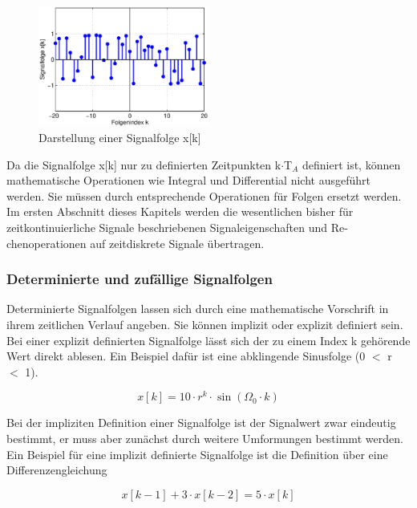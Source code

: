 \begin{figure}[H]
  \centerline{\includegraphics[width=0.5\textwidth]{Kapitel3/Bilder/image2.eps}}
  \caption{Darstellung einer Signalfolge x[k]}
  \label{fig:Signalfolge}
\end{figure}

\noindent Da die Signalfolge x[k] nur zu definierten Zeitpunkten k$\cdot$T$_{A}$ definiert ist, können mathematische Operationen wie Integral und Differential nicht ausgeführt werden. Sie müssen durch entsprechende Operationen für Folgen ersetzt werden. Im ersten Abschnitt dieses Kapitels werden die wesentlichen bisher für zeitkontinuierliche Signale beschriebenen Signaleigenschaften und Re-chenoperationen auf zeitdiskrete Signale übertragen.

\subsubsection{Determinierte und zufällige Signalfolgen}

\noindent Determinierte Signalfolgen lassen sich durch eine mathematische Vorschrift in ihrem zeitlichen Verlauf angeben. Sie können implizit oder explizit definiert sein. Bei einer explizit definierten Signalfolge lässt sich der zu einem Index k gehörende Wert direkt ablesen. Ein Beispiel dafür ist eine abklingende Sinusfolge (0 $ \mathrm{<} $ r $ \mathrm{<} $ 1). 

\begin{equation}\label{eq:threetwo}
x\left[k\right]=10\cdot r^{k} \cdot \sin \left(\Omega _{0} \cdot k\right)
\end{equation}

\noindent Bei der impliziten Definition einer Signalfolge ist der Signalwert zwar eindeutig bestimmt, er muss aber zunächst durch weitere Umformungen bestimmt werden. Ein Beispiel für eine implizit definierte Signalfolge ist die Definition über eine Differenzengleichung

\begin{equation}\label{eq:threethree}
x\left[k-1\right]+3\cdot x\left[k-2\right]=5\cdot x\left[k\right]
\end{equation}

